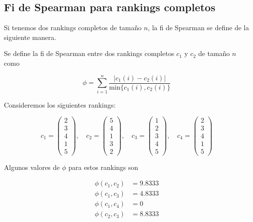 \subsection{Fi de Spearman para rankings completos}

Si tenemos dos rankings completos de tamaño $n$, la fi de Spearman se define de la siguiente manera.

\begin{defi}
Se define la fi de Spearman entre dos rankings completos $c_1$ y $c_2$ de tamaño $n$ como 

\begin{equation}
\phi = \sum\limits_{i=1}^{n} \dfrac{|c_1(i) - c_2(i)|}{\mathrm{min}\{c_1(i), c_2(i)\}}
\end{equation}
\end{defi}

\begin{ejemplo} \label{ej:fi_spearman_completo}
Consideremos los siguientes rankings:

\begin{equation*}
c_1 = \left( \begin{array}{c}
2\\
3\\
4\\
1\\
5
\end{array} \right), \quad
c_2 = \left( \begin{array}{c}
5\\
4\\
1\\
3\\
2
\end{array} \right), \quad
c_3 = \left( \begin{array}{c}
1\\
2\\
3\\
4\\
5
\end{array} \right), \quad
c_4 = \left( \begin{array}{c}
2\\
3\\
4\\
1\\
5
\end{array} \right)
\end{equation*}

Algunos valores de $\phi$ para estos rankings son

\begin{align*}
\phi(c_1, c_2) & = 9.8333 \\
\phi(c_1, c_3) & = 4.8333\\
\phi(c_1, c_4) & = 0\\
\phi(c_2, c_3) & = 8.8333
\end{align*}  
\end{ejemplo}

